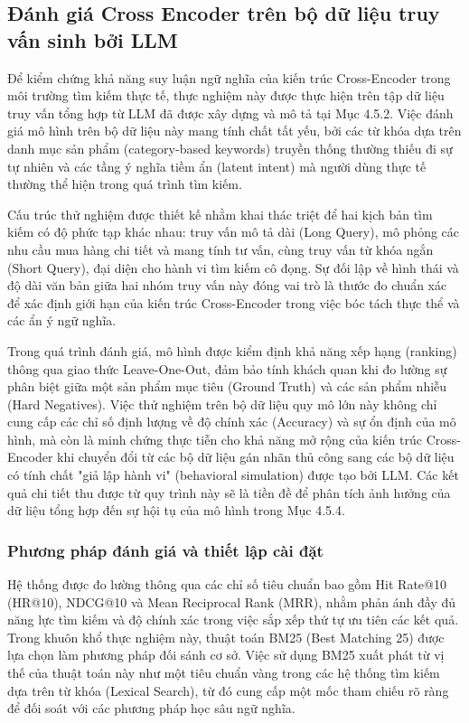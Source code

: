 \subsection{Đánh giá Cross Encoder trên bộ dữ liệu truy vấn sinh bởi LLM}

Để kiểm chứng khả năng suy luận ngữ nghĩa của kiến trúc Cross-Encoder trong môi trường tìm kiếm thực tế, thực nghiệm này được thực hiện trên tập dữ liệu truy vấn tổng hợp từ LLM đã được xây dựng và mô tả tại Mục 4.5.2. Việc đánh giá mô hình trên bộ dữ liệu này mang tính chất tất yếu, bởi các từ khóa dựa trên danh mục sản phẩm (category-based keywords) truyền thống thường thiếu đi sự tự nhiên và các tầng ý nghĩa tiềm ẩn (latent intent) mà người dùng thực tế thường thể hiện trong quá trình tìm kiếm.

Cấu trúc thử nghiệm được thiết kế nhằm khai thác triệt để hai kịch bản tìm kiếm có độ phức tạp khác nhau: truy vấn mô tả dài (Long Query), mô phỏng các nhu cầu mua hàng chi tiết và mang tính tư vấn, cùng truy vấn từ khóa ngắn (Short Query), đại diện cho hành vi tìm kiếm cô đọng. Sự đối lập về hình thái và độ dài văn bản giữa hai nhóm truy vấn này đóng vai trò là thước đo chuẩn xác để xác định giới hạn của kiến trúc Cross-Encoder trong việc bóc tách thực thể và các ẩn ý ngữ nghĩa.

Trong quá trình đánh giá, mô hình được kiểm định khả năng xếp hạng (ranking) thông qua giao thức Leave-One-Out, đảm bảo tính khách quan khi đo lường sự phân biệt giữa một sản phẩm mục tiêu (Ground Truth) và các sản phẩm nhiễu (Hard Negatives). Việc thử nghiệm trên bộ dữ liệu quy mô lớn này không chỉ cung cấp các chỉ số định lượng về độ chính xác (Accuracy) và sự ổn định của mô hình, mà còn là minh chứng thực tiễn cho khả năng mở rộng của kiến trúc Cross-Encoder khi chuyển đổi từ các bộ dữ liệu gán nhãn thủ công sang các bộ dữ liệu có tính chất "giả lập hành vi" (behavioral simulation) được tạo bởi LLM. Các kết quả chi tiết thu được từ quy trình này sẽ là tiền đề để phân tích ảnh hưởng của dữ liệu tổng hợp đến sự hội tụ của mô hình trong Mục 4.5.4.

\subsubsection*{Phương pháp đánh giá và thiết lập cài đặt}

Hệ thống được đo lường thông qua các chỉ số tiêu chuẩn bao gồm Hit Rate@10 (HR@10), NDCG@10 và Mean Reciprocal Rank (MRR), nhằm phản ánh đầy đủ năng lực tìm kiếm và độ chính xác trong việc sắp xếp thứ tự ưu tiên các kết quả. Trong khuôn khổ thực nghiệm này, thuật toán BM25 (Best Matching 25) được lựa chọn làm phương pháp đối sánh cơ sở. Việc sử dụng BM25 xuất phát từ vị thế của thuật toán này như một tiêu chuẩn vàng trong các hệ thống tìm kiếm dựa trên từ khóa (Lexical Search), từ đó cung cấp một mốc tham chiếu rõ ràng để đối soát với các phương pháp học sâu ngữ nghĩa.

